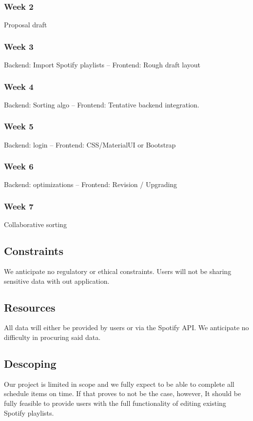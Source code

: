 \documentclass{article}
\begin{document}
\subsubsection{Week 2}
Proposal draft
\subsubsection{Week 3}
Backend: Import Spotify playlists -- Frontend: Rough draft layout
\subsubsection{Week 4}
Backend: Sorting algo -- Frontend: Tentative backend integration.  
\subsubsection{Week 5}
Backend: login -- Frontend: CSS/MaterialUI or Bootstrap
\subsubsection{Week 6}
Backend: optimizations -- Frontend: Revision / Upgrading
\subsubsection{Week 7}
Collaborative sorting
\subsection{Constraints}
We anticipate no regulatory or ethical constraints. Users will not be sharing sensitive data with out application. 
\subsection{Resources}
All data will either be provided by users or via the Spotify API. We anticipate no difficulty in procuring said data.
\subsection{Descoping}
Our project is limited in scope and we fully expect to be able to complete all schedule items on time. 
If that proves to not be the case, however, It should be fully feasible to provide users with the full functionality of editing existing Spotify playlists.
\end{document}
